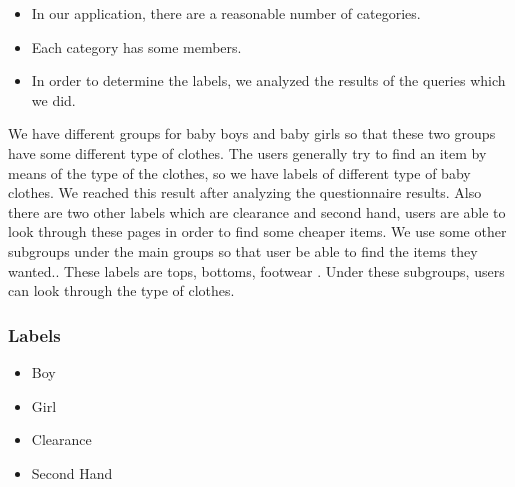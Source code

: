 \begin{itemize}
\item In our application, there are a reasonable number of categories. 
\item Each category has some members. 
\item In order to determine the labels, we analyzed the results of the queries which we did.
\end{itemize}

We have different groups for baby boys and baby girls so that these two groups have some different type of clothes. The users generally try to find an item by means of the type of the clothes, so we have labels of different type of baby clothes. We reached this result after analyzing the questionnaire results. Also there are two other labels which are clearance and second hand, users are able to look through these pages in order to find some cheaper items.
We use some other subgroups under the main groups so that user be able to find the items they wanted.. These labels are tops, bottoms, footwear . Under these subgroups, users can look through the type of clothes.

\subsubsection{Labels}
\begin{itemize}
 \item Boy 
 \item Girl 
 \item Clearance 
 \item Second Hand
\end{itemize}

